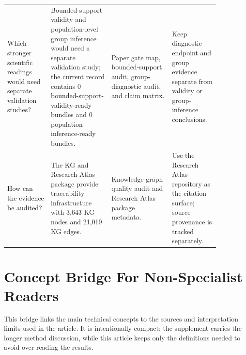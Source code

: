 \documentclass[11pt]{article}
\begin{document}
\begin{tabular}{@{}>{\RaggedRight\arraybackslash}p{0.180\linewidth}>{\RaggedRight\arraybackslash}p{0.250\linewidth}>{\RaggedRight\arraybackslash}p{0.250\linewidth}>{\RaggedRight\arraybackslash}p{0.190\linewidth}@{}}
Which stronger scientific readings would need separate validation studies? & Bounded-support validity and population-level group inference would need a separate validation study; the current record contains 0 bounded-support-validity-ready bundles and 0 population-inference-ready bundles. & Paper gate map, bounded-support audit, group-diagnostic audit, and claim matrix. & Keep diagnostic endpoint and group evidence separate from validity or group-inference conclusions. \\
How can the evidence be audited? & The KG and Research Atlas package provide traceability infrastructure with 3,643 KG nodes and 21,019 KG edges. & Knowledge-graph quality audit and Research Atlas package metadata. & Use the Research Atlas repository as the citation surface; source provenance is tracked separately. \\
\bottomrule
\end{tabular}
\endgroup

\section{Concept Bridge For Non-Specialist Readers}

This bridge links the main technical concepts to the sources and interpretation limits used in the article. It is intentionally compact: the supplement carries the longer method discussion, while this article keeps only the definitions needed to avoid over-reading the results.
\end{document}
